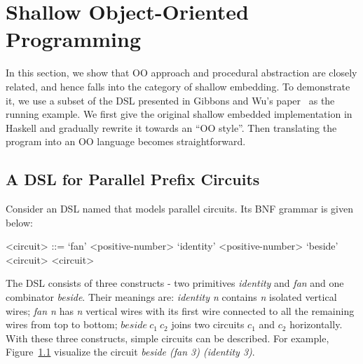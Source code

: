 \section{Shallow Object-Oriented Programming}\label{sec:oo}

\begin{comment}
Weixin writes this part.

Argue that shallow embeddings and straightforward OO 
programs are essentially the same thing. 

Start from a simple shallow DSL in Haskell, 
and iterate throught it until you reach a form 
that looks like an OO program.

Show how todo transformations in Shallow embeddings
using the insight of how to do transformations in OO
programs.

Show the correponding Java programs and the Java program 
with transformation that we can port back to Haskell.
\end{comment}

In this section, we show that OO approach and procedural abstraction are closely
related, and hence falls into the category of shallow embedding.
To demonstrate it, we use a subset
of the DSL presented in Gibbons and Wu's paper~\cite{gibbons2014folding} as the running example.
We first give the original shallow embedded implementation in Haskell
and gradually rewrite it towards an ``OO style''.
Then translating the program into an OO language becomes straightforward.

\subsection{A DSL for Parallel Prefix Circuits}
Consider an DSL named \dsl that models parallel circuits.
Its BNF grammar is given below:
\setlength{\grammarindent}{5em} %

\begin{grammar}
<circuit> ::= `fan' <positive-number>
\alt `identity' <positive-number>
\alt `beside' <circuit> <circuit>
\end{grammar}

The DSL consists of three constructs - two primitives
\emph{identity} and \emph{fan} and one combinator \emph{beside}.
Their meanings are: \emph{identity n} contains \emph{n} isolated vertical wires;
\emph{fan n} has \emph{n} vertical wires with its first wire connected to
all the remaining wires from top to bottom; $beside\ c_1\ c_2$ joins two circuits
$c_1$ and $c_2$ horizontally.
With these three constructs, simple circuits can be described.
For example, Figure~\ref{} visualize the circuit \emph{beside (fan 3) (identity 3)}.

